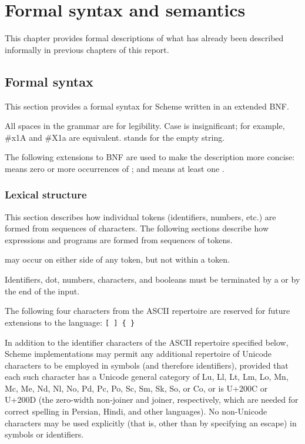 \chapter{Formal syntax and semantics}
\label{formalchapter}

This chapter provides formal descriptions of what has already been
described informally in previous chapters of this report.



\section{Formal syntax}
\label{BNF}

This section provides a formal syntax for Scheme written in an extended
BNF.

All spaces in the grammar are for legibility.  Case is insignificant;
for example, {\cf \#x1A} and {\cf \#X1a} are equivalent.  
stands for the empty string.

The following extensions to BNF are used to make the description more
concise:   means zero or more occurrences of
; and  means at least one
.


\subsection{Lexical structure}

This section describes how individual tokens (identifiers,
numbers, etc.) are formed from sequences of characters.  The following
sections describe how expressions and programs are formed from sequences
of tokens.

 may occur on either side of any token, but not
within a token.

\vest Identifiers, dot, numbers, characters, and booleans must be
terminated by a  or by the end of the input.

The following four characters from the ASCII repertoire
are reserved for future extensions to the
language: {\tt \verb"[" \verb"]" \verb"{" \verb"}"}

In addition to the identifier characters of the ASCII repertoire specified
below, Scheme implementations may permit any additional repertoire of
Unicode characters to be employed in symbols (and therefore identifiers),
provided that each such character has a Unicode general category of Lu,
Ll, Lt, Lm, Lo, Mn, Mc, Me, Nd, Nl, No, Pd, Pc, Po, Sc, Sm, Sk, So,
or Co, or is U+200C or U+200D (the zero-width non-joiner and joiner,
respectively, which are needed for correct spelling in Persian, Hindi,
and other languages). No non-Unicode characters may be used explicitly
(that is, other than by specifying an escape) in symbols or identifiers.


